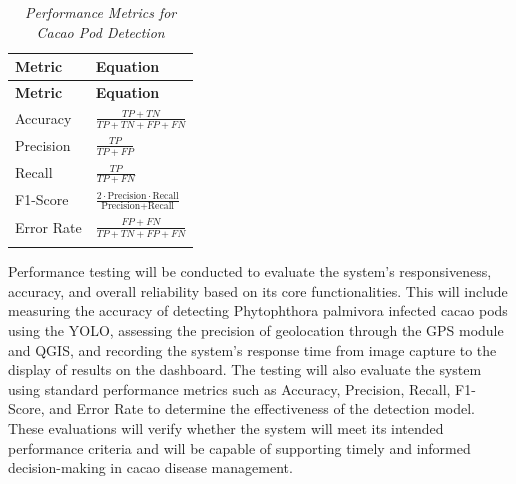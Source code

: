 \begin{longtable}{p{4cm} >{\centering\arraybackslash}p{7cm}}
	\caption{\textit{Performance Metrics for Cacao Pod Detection}} \label{tab:metrics}                    \\
	
	\toprule
	\textbf{Metric} & \textbf{Equation}                                                                   \\
	\midrule
	\endfirsthead
	
	\toprule
	\textbf{Metric} & \textbf{Equation}                                                                   \\
	\midrule
	\endhead
	
	\bottomrule
	\endfoot
	
	Accuracy        &
	$\displaystyle \frac{TP + TN}{TP + TN + FP + FN}$                                                     \\ \addlinespace \addlinespace
	
	Precision       &
	$\displaystyle \frac{TP}{TP + FP}$                                                                    \\ \addlinespace \addlinespace
	
	Recall          &
	$\displaystyle \frac{TP}{TP + FN}$                                                                    \\ \addlinespace \addlinespace
	
	F1-Score        &
	$\displaystyle \frac{2 \cdot \text{Precision} \cdot \text{Recall}}{\text{Precision} + \text{Recall}}$ \\ \addlinespace \addlinespace
	
	Error Rate      &
	$\displaystyle \frac{FP + FN}{TP + TN + FP + FN}$                                                     \\ \addlinespace \addlinespace
\end{longtable}

Performance testing will be conducted to evaluate the system’s responsiveness, accuracy, and overall reliability based on its core functionalities. This will include measuring the accuracy of detecting Phytophthora palmivora infected cacao pods using the YOLO, assessing the precision of geolocation through the GPS module and QGIS, and recording the system’s response time from image capture to the display of results on the dashboard. The testing will also evaluate the system using standard performance metrics such as Accuracy, Precision, Recall, F1-Score, and Error Rate to determine the effectiveness of the detection model. These evaluations will verify whether the system will meet its intended performance criteria and will be capable of supporting timely and informed decision-making in cacao disease management.

